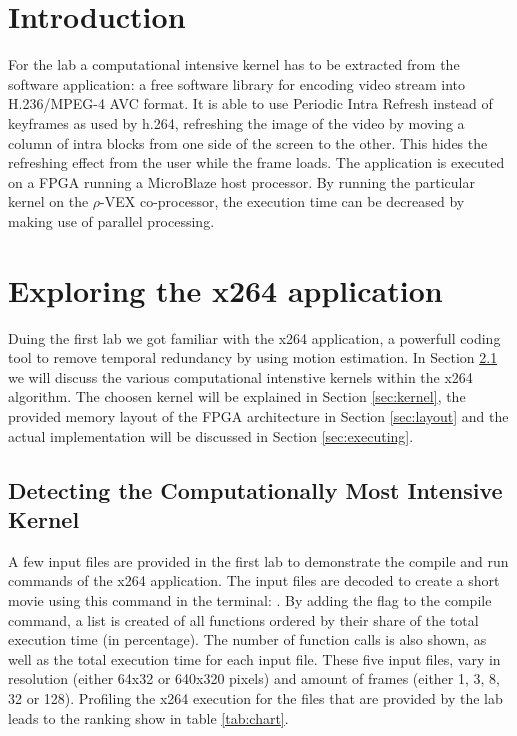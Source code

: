 \section{Introduction}
For the lab a computational intensive kernel has to be extracted from the  software application: a free software library for encoding video stream into H.236/MPEG-4 AVC format. It is able to use Periodic Intra Refresh instead of keyframes as used by h.264, refreshing the image of the video by moving a column of intra blocks from one side of the screen to the other. This hides the refreshing effect from the user while the frame loads. The  application is executed on a FPGA running a MicroBlaze host processor. By running the particular kernel on the $\rho$-VEX co-processor, the execution time can be decreased by making use of parallel processing. 

\section{Exploring the x264 application}
Duing the first lab we got familiar with the x264 application, a powerfull coding tool to remove temporal redundancy by using motion estimation. In Section \ref{sec:intensive} we will discuss the various computational intenstive kernels within the x264 algorithm. The choosen kernel will be explained in Section \ref{sec:kernel}, the provided memory layout of the FPGA architecture in Section \ref{sec:layout} and the actual implementation will be discussed in Section \ref{sec:executing}.

\subsection{Detecting the Computationally Most Intensive Kernel}
\label{sec:intensive}
A few input files are provided in the first lab to demonstrate the compile and run commands of the x264 application. The  input files are decoded to create a short  movie using this command in the terminal: . By adding the  flag to the compile command, a list is created of all functions ordered by their share of the total execution time (in percentage). The number of function calls is also shown, as well as the total execution time for each input file. These five input  files, vary in resolution (either 64x32 or 640x320 pixels) and amount of frames (either 1, 3, 8, 32 or 128). Profiling the x264 execution for the  files that are provided by the lab leads to the ranking show in table \ref{tab:chart}.

